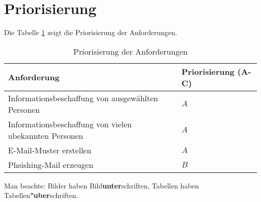\FloatBarrier
\section{Priorisierung} %
\label{sec:} %
Die Tabelle \ref{tab:prio} zeigt die Priorisierung der Anforderungen.

\begin{table}
	
	\caption{Priorisierung der Anforderungen}
	\label{tab:prio}
	\begin{center} 
		\begin{tabular}{|l|l|}
			\hline
			Anforderung & Priorisierung (A-C) \\
			\hline
			Informationsbeschaffung von ausgewählten Personen & $ A $ \\
			\hline
			Informationsbeschaffung von vielen ubekannten Personen & $ A $ \\
			\hline
			E-Mail-Muster erstellen & $ A $    \\
			\hline
			Phsishing-Mail erzeugen & $ B $   \\
			\hline
		\end{tabular}
	\end{center}
\end{table}
\FloatBarrier
Man beachte: Bilder haben Bild{\bf unter}schriften, 
Tabellen haben Tabellen{\bf "uber}schriften.
